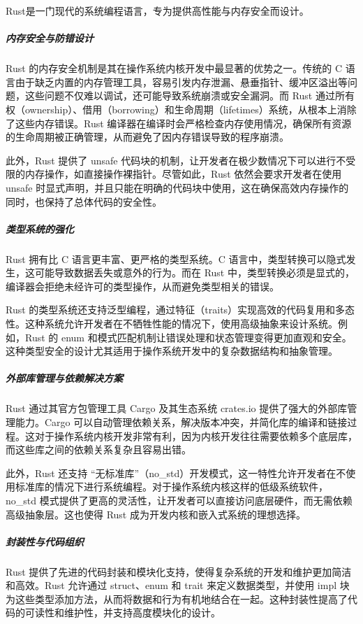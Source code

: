 Rust是一门现代的系统编程语言，专为提供高性能与内存安全而设计。

\subparagraph{内存安全与防错设计}

Rust 的内存安全机制是其在操作系统内核开发中最显著的优势之一。传统的 C 语言由于缺乏内置的内存管理工具，容易引发内存泄漏、悬垂指针、缓冲区溢出等问题，这些问题不仅难以调试，还可能导致系统崩溃或安全漏洞。而 Rust 通过所有权（ownership）、借用（borrowing）和生命周期（lifetimes）系统，从根本上消除了这些内存错误。Rust 编译器在编译时会严格检查内存使用情况，确保所有资源的生命周期被正确管理，从而避免了因内存错误导致的程序崩溃。

此外，Rust 提供了 unsafe 代码块的机制，让开发者在极少数情况下可以进行不受限的内存操作，如直接操作裸指针。尽管如此，Rust 依然会要求开发者在使用 unsafe 时显式声明，并且只能在明确的代码块中使用，这在确保高效内存操作的同时，也保持了总体代码的安全性。

\subparagraph{类型系统的强化}

Rust 拥有比 C 语言更丰富、更严格的类型系统。C 语言中，类型转换可以隐式发生，这可能导致数据丢失或意外的行为。而在 Rust 中，类型转换必须是显式的，编译器会拒绝未经许可的类型操作，从而避免类型相关的错误。

Rust 的类型系统还支持泛型编程，通过特征（traits）实现高效的代码复用和多态性。这种系统允许开发者在不牺牲性能的情况下，使用高级抽象来设计系统。例如，Rust 的 enum 和模式匹配机制让错误处理和状态管理变得更加直观和安全。这种类型安全的设计尤其适用于操作系统开发中的复杂数据结构和抽象管理。

\subparagraph{外部库管理与依赖解决方案}

Rust 通过其官方包管理工具 Cargo 及其生态系统 crates.io 提供了强大的外部库管理能力。Cargo 可以自动管理依赖关系，解决版本冲突，并简化库的编译和链接过程。这对于操作系统内核开发非常有利，因为内核开发往往需要依赖多个底层库，而这些库之间的依赖关系复杂且容易出错。

此外，Rust 还支持 “无标准库”（no\_std）开发模式，这一特性允许开发者在不使用标准库的情况下进行系统编程。对于操作系统内核这样的低级系统软件，no\_std 模式提供了更高的灵活性，让开发者可以直接访问底层硬件，而无需依赖高级抽象层。这也使得 Rust 成为开发内核和嵌入式系统的理想选择。

\subparagraph{封装性与代码组织}

Rust 提供了先进的代码封装和模块化支持，使得复杂系统的开发和维护更加简洁和高效。Rust 允许通过 struct、enum 和 trait 来定义数据类型，并使用 impl 块为这些类型添加方法，从而将数据和行为有机地结合在一起。这种封装性提高了代码的可读性和维护性，并支持高度模块化的设计。

